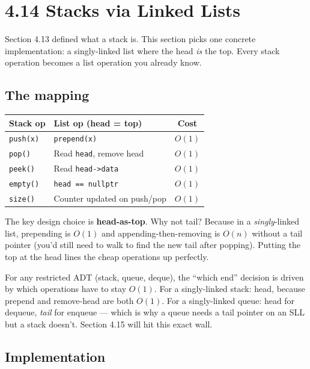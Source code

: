 \documentclass[11pt]{article}
\begin{document}
\section{4.14 Stacks via Linked Lists}

Section 4.13 defined what a stack is. This section picks one
concrete implementation: a singly-linked list where the head
\emph{is} the top. Every stack operation becomes a list operation
you already know.

\subsection*{The mapping}

\begin{center}
\begin{tabular}{|l|l|c|}
\hline
\textbf{Stack op} & \textbf{List op (head = top)} & \textbf{Cost} \\
\hline
\texttt{push(x)}  & \texttt{prepend(x)}           & $O(1)$ \\
\texttt{pop()}    & Read \texttt{head}, remove head & $O(1)$ \\
\texttt{peek()}   & Read \texttt{head->data}      & $O(1)$ \\
\texttt{empty()}  & \texttt{head == nullptr}      & $O(1)$ \\
\texttt{size()}   & Counter updated on push/pop   & $O(1)$ \\
\hline
\end{tabular}
\end{center}

The key design choice is \textbf{head-as-top}. Why not tail?
Because in a \emph{singly}-linked list, prepending is $O(1)$ and
appending-then-removing is $O(n)$ without a tail pointer (you'd
still need to walk to find the new tail after popping). Putting
the top at the head lines the cheap operations up perfectly.

\begin{ideabox}
For any restricted ADT (stack, queue, deque), the ``which end''
decision is driven by which operations have to stay $O(1)$. For
a singly-linked stack: head, because prepend and remove-head are
both $O(1)$. For a singly-linked queue: head for dequeue,
\emph{tail} for enqueue --- which is why a queue needs a tail
pointer on an SLL but a stack doesn't. Section 4.15 will hit this
exact wall.
\end{ideabox}

\subsection*{Implementation}
\end{document}
